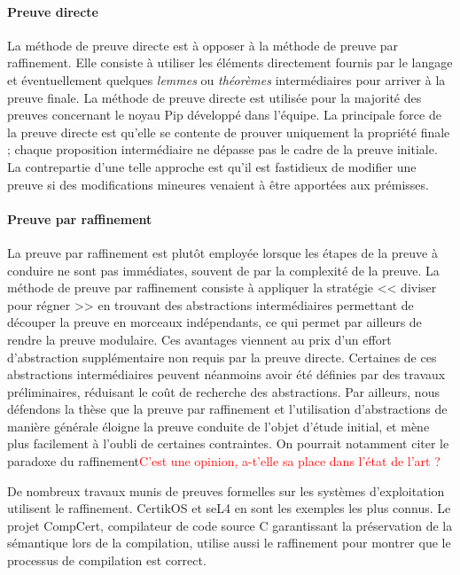 			\paragraph{Preuve directe} La méthode de preuve directe est à opposer à la méthode de preuve par raffinement. Elle consiste à utiliser les éléments directement fournis par le langage et éventuellement quelques \emph{lemmes} ou \emph{théorèmes} intermédiaires pour arriver à la preuve finale. La méthode de preuve directe est utilisée pour la majorité des preuves concernant le noyau Pip développé dans l'équipe. La principale force de la preuve directe est qu'elle se contente de prouver uniquement la propriété finale ; chaque proposition intermédiaire ne dépasse pas le cadre de la preuve initiale. La contrepartie d'une telle approche est qu'il est fastidieux de modifier une preuve si des modifications mineures venaient à être apportées aux prémisses.
			
			\paragraph{Preuve par raffinement} La preuve par raffinement est plutôt employée lorsque les étapes de la preuve à conduire ne sont pas immédiates, souvent de par la complexité de la preuve. La méthode de preuve par raffinement consiste à appliquer la stratégie << diviser pour régner >> en trouvant des abstractions intermédiaires permettant de découper la preuve en morceaux indépendants, ce qui permet par ailleurs de rendre la preuve modulaire. Ces avantages viennent au prix d'un effort d'abstraction supplémentaire non requis par la preuve directe. Certaines de ces abstractions intermédiaires peuvent néanmoins avoir été définies par des travaux préliminaires, réduisant le coût de recherche des abstractions. Par ailleurs, nous défendons la thèse que la preuve par raffinement et l'utilisation d'abstractions de manière générale éloigne la preuve conduite de l'objet d'étude initial, et mène plus facilement à l'oubli de certaines contraintes. On pourrait notamment citer le paradoxe du raffinement\textcolor{red}{C'est une opinion, a-t'elle sa place dans l'état de l'art ?}

			De nombreux travaux munis de preuves formelles sur les systèmes d'exploitation utilisent le raffinement. CertikOS et seL4 en sont les exemples les plus connus. Le projet CompCert, compilateur de code source C garantissant la préservation de la sémantique lors de la compilation, utilise aussi le raffinement pour montrer que le processus de compilation est correct.

